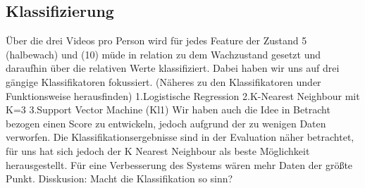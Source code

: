 \subsection{Klassifizierung}
\label{sec:classification}
Über die drei Videos pro Person wird für jedes Feature der Zustand 5 (halbewach) und (10) müde in relation zu dem Wachzustand gesetzt und daraufhin über die relativen Werte klassifiziert. Dabei haben wir uns auf drei gängige Klassifikatoren fokussiert. (Näheres zu den Klassifikatoren under Funktionsweise herausfinden)
1.Logistische Regression
2.K-Nearest Neighbour mit K=3
3.Support Vector Machine (Kl1)
Wir haben auch die Idee in Betracht bezogen einen Score zu entwickeln, jedoch aufgrund der zu wenigen Daten verworfen.
Die Klassifikationsergebnisse sind in der Evaluation näher betrachtet, für uns hat sich jedoch der K Nearest Neighbour als beste Möglichkeit herausgestellt. Für eine Verbesserung des Systems wären mehr Daten der größte Punkt.
Disskusion: Macht die Klassifikation so sinn?
